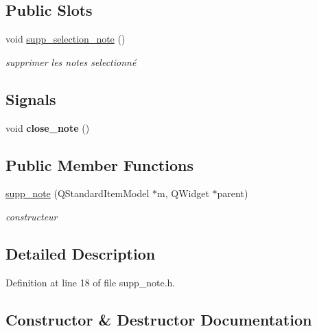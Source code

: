 \subsection*{Public Slots}
\begin{DoxyCompactItemize}
\item 
void \hyperlink{classsupp__note_a5dbf6d3af5c94d71f42eeb2cf626c9d3}{supp\+\_\+selection\+\_\+note} ()
\begin{DoxyCompactList}\small\item\em supprimer les notes selectionné \end{DoxyCompactList}\end{DoxyCompactItemize}
\subsection*{Signals}
\begin{DoxyCompactItemize}
\item 
\mbox{\label{classsupp__note_a0a45d0adbe61d17cb5d088103955da7c}} 
void {\bfseries close\+\_\+note} ()
\end{DoxyCompactItemize}
\subsection*{Public Member Functions}
\begin{DoxyCompactItemize}
\item 
\hyperlink{classsupp__note_a0a8f0c351866f8026cabfd981b919889}{supp\+\_\+note} (Q\+Standard\+Item\+Model $\ast$m, Q\+Widget $\ast$parent)
\begin{DoxyCompactList}\small\item\em constructeur \end{DoxyCompactList}\end{DoxyCompactItemize}


\subsection{Detailed Description}


Definition at line 18 of file supp\+\_\+note.\+h.



\subsection{Constructor \& Destructor Documentation}
\mbox{\label{classsupp__note_a0a8f0c351866f8026cabfd981b919889}} 
